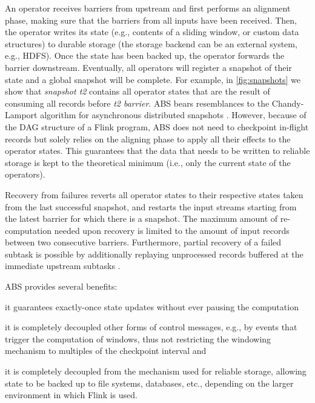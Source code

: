 \documentclass[11pt]{article}
\begin{document}
An operator receives barriers from upstream and first performs an alignment phase, making sure that the barriers from all inputs have been received. Then, the operator writes its state (e.g., contents of a sliding window, or custom data structures) to durable storage (the storage backend can be an external system, e.g., HDFS). Once the state has been backed up, the operator forwards the barrier downstream. Eventually, all operators will register a snapshot of their state and a global snapshot will be complete. For example, in \autoref{fig:snapshots} we show that \emph{snapshot t2} contains all operator states that are the result of consuming all records before \emph{t2 barrier}. ABS bears resemblances to the Chandy-Lamport algorithm for asynchronous distributed snapshots \cite{chandy1985distributed}. However, because of the DAG structure of a Flink program, ABS does not need to checkpoint in-flight records but solely relies on the aligning phase to apply all their effects to the operator states. This guarantees that the data that needs to be written to reliable storage is kept to the theoretical minimum (i.e., only the current state of the operators).

Recovery from failures reverts all operator states to their respective states taken from the last successful snapshot, and restarts the input streams starting from the latest barrier for which there is a snapshot. The maximum amount of re-computation needed upon recovery is limited to the amount of input records between two consecutive barriers. Furthermore, partial recovery of a failed subtask is possible by additionally replaying unprocessed records  buffered at the immediate upstream subtasks \cite{carbone2015lightweight}.

\vspace{1mm}
\noindent ABS provides several benefits:
\begin{inparaenum}[i)]
\item it guarantees exactly-once state updates without ever pausing the computation
\item it is completely decoupled other forms of control messages, e.g., by events that trigger the computation of windows, thus not restricting the windowing mechanism to multiples of the checkpoint interval and
\item it is completely decoupled from the mechanism used for reliable storage, allowing state to be backed up to file systems, databases, etc., depending on the larger environment in which Flink is used.
\end{inparaenum}
\end{document}
